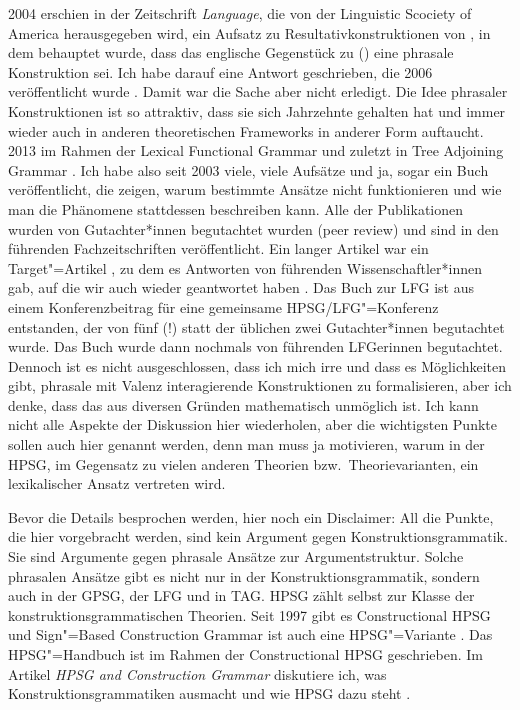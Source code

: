 2004 erschien in der Zeitschrift \emph{Language}, die von der Linguistic Scociety of America
herausgegeben wird, ein Aufsatz zu Resultativkonstruktionen von \citet{GJ2004a}, in dem behauptet
wurde, dass das englische Gegenstück zu () eine phrasale Konstruktion sei. Ich habe darauf
eine Antwort geschrieben, die 2006 veröffentlicht wurde \citep{Mueller2006d}. Damit war die Sache
aber nicht erledigt. Die Idee phrasaler Konstruktionen ist so attraktiv, dass sie sich Jahrzehnte
gehalten hat und immer wieder auch in anderen theoretischen Frameworks in anderer Form
auftaucht. 2013 im Rahmen der Lexical Functional Grammar \citep{Toivonen2013a,ADT2013a} und zuletzt in Tree Adjoining
Grammar \citep{Seyffarth2023a}. Ich habe also seit 2003 viele, viele Aufsätze und ja, sogar ein Buch veröffentlicht, die
zeigen, warum bestimmte Ansätze nicht funktionieren und wie man die Phänomene stattdessen
beschreiben kann. Alle der Publikationen wurden von Gutachter*innen begutachtet wurden (peer
review) und sind in den führenden Fachzeitschriften veröffentlicht. Ein langer Artikel war ein
Target"=Artikel \citep{MWArgSt}, zu dem es Antworten von führenden Wissenschaftler*innen gab, auf die wir auch
wieder geantwortet haben \citep{MWArgStReply}. Das Buch zur LFG \citep{MuellerLFGphrasal} ist aus einem
Konferenzbeitrag für eine gemeinsame HPSG/LFG"=Konferenz \citep{MuellerHeadLex} entstanden, der von
fünf (!) statt der üblichen zwei Gutachter*innen begutachtet wurde. Das Buch wurde dann nochmals von
führenden LFGerinnen begutachtet. Dennoch ist es nicht ausgeschlossen, dass ich mich irre und dass
es Möglichkeiten gibt, phrasale mit Valenz interagierende Konstruktionen zu formalisieren, aber ich
denke, dass das aus diversen Gründen mathematisch unmöglich ist. Ich kann nicht alle Aspekte der Diskussion hier
wiederholen, aber die wichtigsten Punkte sollen auch hier genannt werden, denn man muss ja
motivieren, warum in der HPSG, im Gegensatz zu vielen anderen Theorien bzw.\ Theorievarianten, ein lexikalischer Ansatz
vertreten wird.

Bevor die Details besprochen werden, hier noch ein Disclaimer: All die Punkte, die hier vorgebracht
werden, sind kein Argument gegen Konstruktionsgrammatik. Sie sind Argumente gegen phrasale Ansätze
zur Argumentstruktur. Solche phrasalen Ansätze gibt es nicht nur in der Konstruktionsgrammatik,
sondern auch in der GPSG, der LFG und in TAG. HPSG zählt selbst zur Klasse der konstruktionsgrammatischen Theorien. Seit
1997 gibt es Constructional HPSG \citep{Sag97a} und Sign"=Based Construction Grammar ist auch eine
HPSG"=Variante \citep[]{Sag2010b}. Das HPSG"=Handbuch \citep{HPSGHandbook} ist im Rahmen der Constructional HPSG
geschrieben. Im Artikel \emph{HPSG and Construction Grammar} diskutiere ich, was 
Konstruktionsgrammatiken ausmacht und wie HPSG dazu steht \citep{MuellerCxG}.


